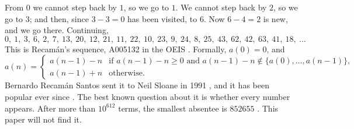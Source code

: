 \documentclass[11pt]{amsart}
\theoremstyle{definition}
\begin{document}
From $0$ we cannot step back by $1$, so we go to $1$. We cannot step back by $2$, so we go to $3$; and then, since $3-3=0$ has been
visited, to $6$. Now $6-4=2$ is new, and we go there. Continuing,
\[
  0,\ 1,\ 3,\ 6,\ 2,\ 7,\ 13,\ 20,\ 12,\ 21,\ 11,\ 22,\ 10,\ 23,\ 9,\ 24,\ 8,\ 25,\ 43,\ 62,\ 42,\ 63,\ 41,\ 18,\ \dots
\]
This is Recam\'an's sequence, A005132 in the OEIS \cite{OEIS}. Formally, $a(0)=0$, and
\begin{equation}\label{eq:def}
  a(n)=\begin{cases}
    a(n-1)-n & \text{if } a(n-1)-n\ge 0 \text{ and } a(n-1)-n\notin\{a(0),\dots,a(n-1)\},\\
    a(n-1)+n & \text{otherwise.}
  \end{cases}
\end{equation}
Bernardo Recam\'an Santos sent it to Neil Sloane in 1991 \cite{Recaman1991}, and it has been popular ever since
\cite{Sloane1999,Cousins2022,Sloane2023}. The best known question about it is whether every number appears. After more than $10^{612}$ terms, the
smallest absentee is $852655$ \cite{OEIS,Chaffin2026}. This paper will not find it.
\end{document}
